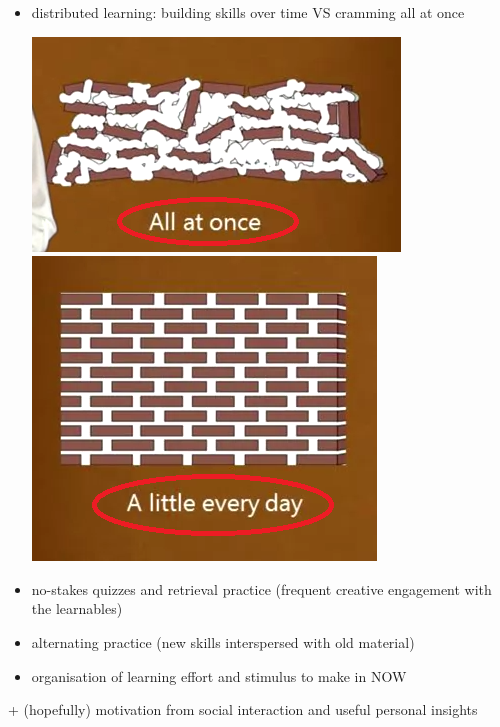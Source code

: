 \documentclass[a4paper,12pt]{article} %
\begin{document}
\begin{center}
	
\begin{tcolorbox}[width=\textwidth, colback={blue!10!white}, title={\textbf{Learning strategies behind the workshop design (in the order of importance)}}, colbacktitle=blue!30!white, coltitle=black]
	\begin{itemize}
		\item distributed learning: building skills over time VS cramming all at once
		
		\begin{center}
			\includegraphics[width=40 mm]{pics/all at once.png} \hspace{2cm}
			\includegraphics[width=30 mm]{pics/a little every day.png}
		\end{center}
	
		\item no-stakes quizzes and retrieval practice (frequent creative engagement with the learnables)
		\item alternating practice (new skills interspersed with old material)
		\item organisation of learning effort and stimulus to make in NOW
	\end{itemize}

\bigskip

+ (hopefully) motivation from social interaction and useful personal insights
	
\end{tcolorbox}%

\bigskip

\begin{tcolorbox}[width=\textwidth, colback={yellow!40!white}, title={\textbf{Housekeeping}}, colbacktitle=yellow!60!white, coltitle=black]
	
	\begin{multicols}{2}


\end{multicols}
\end{tcolorbox}
\end{center}
\end{document}
